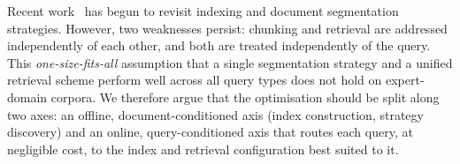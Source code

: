 

Recent work~\cite{hipporagv2,adaptive_chunking} has begun to revisit
indexing and document segmentation strategies. However, two weaknesses
persist: chunking and retrieval are addressed independently of each
other, and both are treated independently of the query. This
\emph{one-size-fits-all} assumption that a single segmentation
strategy and a unified retrieval scheme perform well across all query
types does not hold on expert-domain corpora. We therefore
argue that the optimisation should be split along two axes: an
offline, document-conditioned axis (index construction, strategy
discovery) and an online, query-conditioned axis that routes
each query, at negligible cost, to the index and retrieval
configuration best suited to it.



